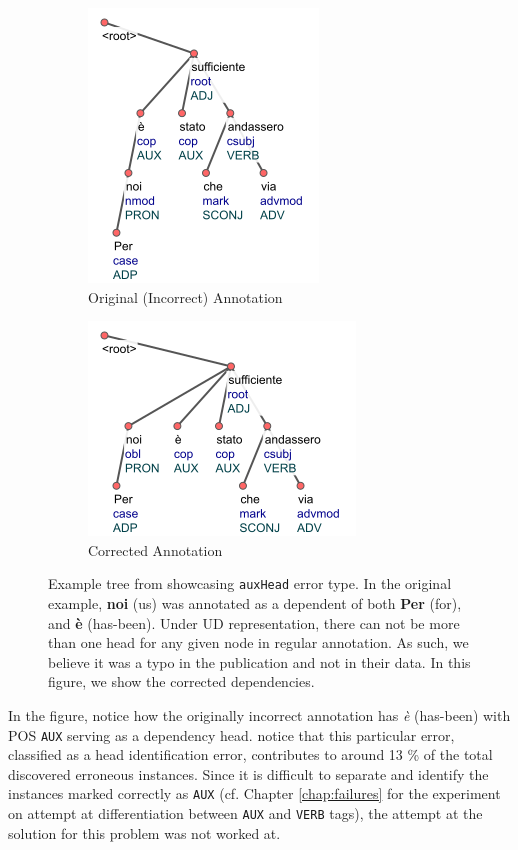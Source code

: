 \begin{figure}[H]
    \centering
    \begin{subfigure}{.45\textwidth}
  \centering
  \includegraphics[scale=0.90]{img/before-aux.png}
  \caption{Original (Incorrect) Annotation}
  \label{fig:aux-head-skewed}
  \end{subfigure}
  \begin{subfigure}{.45\textwidth}
  \centering
  \includegraphics[scale=0.90]{img/after-aux.png}
  \caption{Corrected Annotation}
  \label{fig:aux-head-corrected}
  \end{subfigure}
    \caption[Example tree from \cite{alzetta2017dangerous} showcasing \texttt{auxHead} error type]{Example tree from \cite{alzetta2017dangerous} showcasing \texttt{auxHead} error type. In the original example, \textbf{noi} (us) was annotated as a dependent of both  \textbf{Per} (for), and \textbf{\`e} (has-been). Under UD representation, there can not be more than one head for any given node in regular annotation. As such, we believe it was a typo in the publication and not in their data. In this figure, we show the corrected dependencies.}
    \label{fig:aux-head-example}
\end{figure}
    
In the figure, notice how the originally incorrect annotation has \textit{\`e} (has-been) with POS \verb|AUX| serving as a dependency head. \citeauthor{alzetta2017dangerous} notice that this particular error, classified as a head identification error, contributes to around 13 \% of the total discovered erroneous instances. Since it is difficult to separate and identify the instances marked correctly as \verb|AUX| (cf. Chapter \ref{chap:failures} for the experiment on attempt at differentiation between \verb|AUX| and \verb|VERB|  tags), the attempt at the solution for this problem was not worked at.

